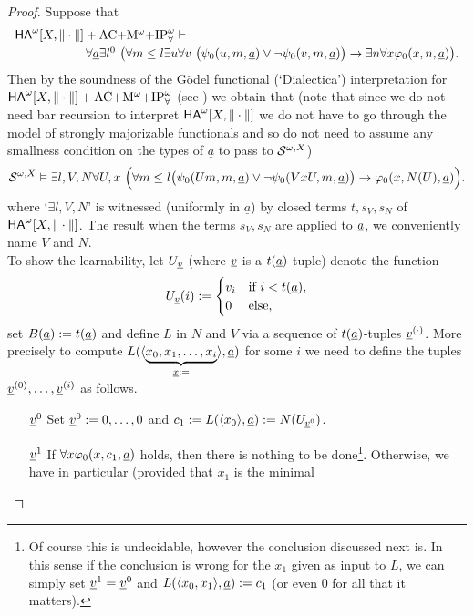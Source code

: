 \begin{proof}
Suppose that 
\[ \ba{l} 
\ha[X,\|\cdot\|]+\mbox{AC$+$M$^{\omega}+$IP}^{\omega}_{\forall} 
\vdash \\[1mm] \hspace*{2cm} 
\forall \underline{a}\exists l^0\ \big( 
\forall m\leq l \exists u \forall v\ \big(\psi_0(u,m,\tup a) \vee \neg\psi_0(v,m,\tup a)\big)\rightarrow \exists n \forall x \phi_0(x,n,\tup a)\big).
\ea \]
Then by the soundness of the G\"odel functional (`Dialectica') 
interpretation for $\ha[X,\|\cdot\|]+\mbox{AC$+$M$^{\omega}+$IP}^{\omega}_{\forall}$ (see \cite{Kohlenbach08}) we obtain that (note that since we do not need 
bar recursion to interpret $\ha[X,\|\cdot\|]$ we do not have to go through 
the model of strongly majorizable functionals and so do not need to assume 
any smallness condition on the types of $\underline{a}$ to pass to 
${\cal S}^{\omega,X}$)   
\[ {\cal S}^{\omega,X} \models \exists l,V,N \forall U,x\ \Big(\forall m\leq l 
\big (\psi_0(Um,m,\tup a) \vee \neg\psi_0(VxU,m,\tup a)\big)
\rightarrow \phi_0(x,N(U),\tup a)\Big).
\]
where `$\exists l,V,N$' is witnessed (uniformly in $\underline{a}$) 
by closed terms $t,s_V,s_N$ of 
$\ha[X,\|\cdot\|]$. 
The result when the terms $s_V,s_N$ are applied to 
$\tup a$, we conveniently name $V$ and $N$.\\
To show the learnability, let $U_{\tup v}$ (where $\tup v$ is a $t(\tup a)$-tuple) denote the function \[
U_{\tup v}(i):=\begin{cases}
v_i&\Tif\ i<t(\tup a),\\
0&\Telse,
\end{cases}\] set $B(\tup a):=t(\tup a)$ and define $L$ in $N$ and $V$ via a sequence of $t(\tup a)$-tuples $\tup v^{(\cdot)}$.
More precisely to compute $L(\langle \underbrace {x_0,x_1,\ldots,x_i}_{\tup x:=}\rangle,\tup a)$ for some $i$ we need to
define the tuples $\tup v^{(0)},\ldots,\tup v^{(i)}$ as follows.
\begin{enumerate}
\item[$\tup v^0$] 
Set $\tup v^0:=0,\ldots,0$ and $c_1:=L(\langle x_0\rangle,\tup a):=
N(U_{\tup v^0})$.
\item[$\tup v^1$] If $\forall x \phi_0(x,c_1,\tup a)$ holds, then there is nothing to be 
done\footnote{
Of course this is undecidable, however the conclusion discussed next is. In this sense if the conclusion is wrong for the $x_1$ given as input to $L$, 
we can simply set $\tup v^1=\tup v^0$ and $L(\langle x_0,x_1\rangle,\tup a):=c_1$ (or even $0$ for all that it matters).
}. 
Otherwise, we have in particular (provided that $x_1$ is the minimal 

\end{enumerate}
\end{proof}
